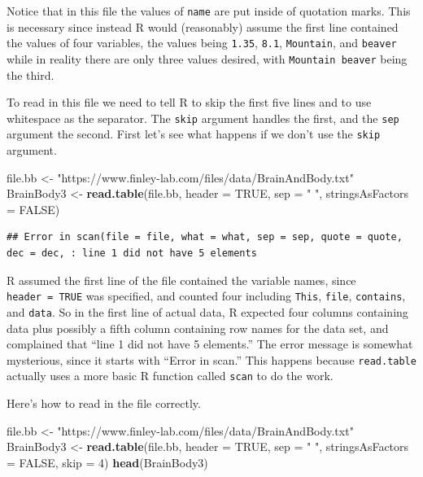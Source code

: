 \documentclass[
]{krantz}
\newenvironment{Shaded}{\begin{snugshade}}{\end{snugshade}}
\newcommand{\DataTypeTok}[1]{\textcolor[rgb]{0.13,0.29,0.53}{#1}}
\newcommand{\DecValTok}[1]{\textcolor[rgb]{0.00,0.00,0.81}{#1}}
\newcommand{\KeywordTok}[1]{\textcolor[rgb]{0.13,0.29,0.53}{\textbf{#1}}}
\newcommand{\NormalTok}[1]{#1}
\newcommand{\OtherTok}[1]{\textcolor[rgb]{0.56,0.35,0.01}{#1}}
\newcommand{\StringTok}[1]{\textcolor[rgb]{0.31,0.60,0.02}{#1}}
\begin{document}
Notice that in this file the values of \texttt{name} are put inside of quotation marks. This is necessary since instead R would (reasonably) assume the first line contained the values of four variables, the values being \texttt{1.35}, \texttt{8.1}, \texttt{Mountain}, and \texttt{beaver} while in reality there are only three values desired, with \texttt{Mountain\ beaver} being the third.

To read in this file we need to tell R to skip the first five lines and to use whitespace as the separator. The \texttt{skip} argument handles the first, and the \texttt{sep} argument the second. First let's see what happens if we don't use the \texttt{skip} argument.

\begin{Shaded}
\begin{Highlighting}[]
\NormalTok{file.bb \textless{}{-}}\StringTok{ "https://www.finley{-}lab.com/files/data/BrainAndBody.txt"}
\NormalTok{BrainBody3 \textless{}{-}}\StringTok{ }\KeywordTok{read.table}\NormalTok{(file.bb, }\DataTypeTok{header =} \OtherTok{TRUE}\NormalTok{, }\DataTypeTok{sep =} \StringTok{" "}\NormalTok{,}
                         \DataTypeTok{stringsAsFactors =} \OtherTok{FALSE}\NormalTok{)}
\end{Highlighting}
\end{Shaded}

\begin{verbatim}
## Error in scan(file = file, what = what, sep = sep, quote = quote, dec = dec, : line 1 did not have 5 elements
\end{verbatim}

R assumed the first line of the file contained the variable names, since \texttt{header\ =\ TRUE} was specified, and counted four including \texttt{This}, \texttt{file}, \texttt{contains}, and \texttt{data}. So in the first line of actual data, R expected four columns containing data plus possibly a fifth column containing row names for the data set, and complained that ``line 1 did not have 5 elements.'' The error message is somewhat mysterious, since it starts with ``Error in scan.'' This happens because \texttt{read.table} actually uses a more basic R function called \texttt{scan} to do the work.

Here's how to read in the file correctly.

\begin{Shaded}
\begin{Highlighting}[]
\NormalTok{file.bb \textless{}{-}}\StringTok{ "https://www.finley{-}lab.com/files/data/BrainAndBody.txt"}
\NormalTok{BrainBody3 \textless{}{-}}\StringTok{ }\KeywordTok{read.table}\NormalTok{(file.bb, }\DataTypeTok{header =} \OtherTok{TRUE}\NormalTok{, }\DataTypeTok{sep =} \StringTok{" "}\NormalTok{,}
                         \DataTypeTok{stringsAsFactors =} \OtherTok{FALSE}\NormalTok{, }\DataTypeTok{skip =} \DecValTok{4}\NormalTok{)}
\KeywordTok{head}\NormalTok{(BrainBody3)}
\end{Highlighting}
\end{Shaded}
\end{document}

